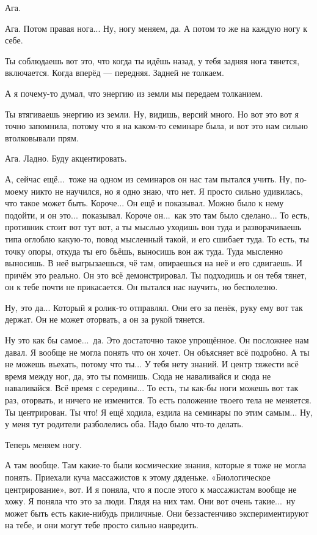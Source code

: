 \M
Ага.

\I
Ага. Потом правая нога... Ну, ногу меняем, да.
А потом то же на каждую ногу к себе.

\M
Ты соблюдаешь вот это, что когда ты идёшь назад, у тебя задняя нога тянется, включается.
Когда вперёд --- передняя.
Задней не толкаем.

\I
А я почему-то думал, что энергию из земли мы передаем толканием.

\M
Ты втягиваешь энергию из земли.
Ну, видишь, версий много.
Но вот это вот я точно запомнила, потому что я на каком-то семинаре была, и
вот это нам сильно втолковывали прям.

\I
Ага. Ладно. Буду акцентировать.

\M
А, сейчас ещё...\ тоже на одном из семинаров он нас там пытался учить.
Ну, по-моему никто не научился, но я одно знаю, что нет. Я просто сильно удивилась,
что такое может быть. Короче... Он ещё и показывал. Можно было к нему
подойти, и он это...\ показывал. Короче он...\ как это там было сделано...
То есть, противник стоит вот тут вот, а ты мыслью уходишь вон туда и разворачиваешь
типа оглоблю какую-то, повод мысленный такой, и его сшибает туда. То есть, ты точку опоры,
откуда ты его бьёшь, выносишь вон аж туда. Туда мысленно выносишь. В неё
выгрызаешься, чё там, опираешься на неё и его
сдвигаешь. И причём это реально. Он это всё демонстрировал.
Ты подходишь и он тебя тянет, он к тебе почти не прикасается.
Он пытался нас научить, но бесполезно.

\I
Ну, это да... Который я ролик-то отправлял. Они его за пенёк, руку ему вот так держат.
Он не может оторвать, а он за рукой тянется.

\M
Ну это как бы самое...\ да. Это достаточно такое упрощённое.
Он посложнее нам давал. Я вообще не могла понять
что он хочет. Он объясняет всё подробно. А ты не можешь въехать, потому что ты...
У тебя нету знаний. И центр тяжести всё время
между ног, да, это ты помнишь. Сюда не наваливайся
и сюда не наваливайся. Всё время с середины...
То есть, ты как-бы ноги можешь вот так раз, оторвать, и ничего не изменится.
То есть положение твоего тела не меняется.
Ты центрирован.
Ты что!
Я ещё ходила, ездила на семинары по этим самым...
Ну, у меня тут родители разболелись оба.
Надо было что-то делать.

\I
Теперь меняем ногу.

\M
А там вообще. Там какие-то были
космические знания, которые я тоже не могла понять. Приехали куча массажистов
к этому дяденьке. «Биологическое центрирование», вот. И я поняла, что я после этого к массажистам
вообще не хожу. Я поняла что это за люди. Глядя на них там.
Они вот очень такие...\ ну может
быть есть какие-нибудь приличные. Они беззастенчиво экспериментируют на тебе, и они могут тебе
просто сильно навредить.

